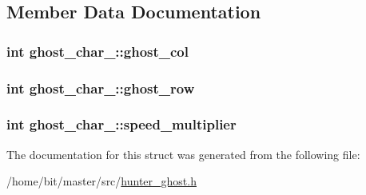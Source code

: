 \subsection{Member Data Documentation}
\hypertarget{structghost__char__2_ac4e881e8acd28d1ba0157a7700a625f2}{
\subsubsection[{ghost\-\_\-col}]{\setlength{\rightskip}{0pt plus 5cm}int ghost\-\_\-char\-\_\-::ghost\-\_\-col}}\label{structghost__char__2_ac4e881e8acd28d1ba0157a7700a625f2}
\hypertarget{structghost__char__2_a20d27159bd360d3caba98c961defec53}{
\subsubsection[{ghost\-\_\-row}]{\setlength{\rightskip}{0pt plus 5cm}int ghost\-\_\-char\-\_\-::ghost\-\_\-row}}\label{structghost__char__2_a20d27159bd360d3caba98c961defec53}
\hypertarget{structghost__char__2_a656d3a3b2495e63e6f4a7f751cc0fea4}{
\subsubsection[{speed\-\_\-multiplier}]{\setlength{\rightskip}{0pt plus 5cm}int ghost\-\_\-char\-\_\-::speed\-\_\-multiplier}}\label{structghost__char__2_a656d3a3b2495e63e6f4a7f751cc0fea4}


The documentation for this struct was generated from the following file\-:\begin{DoxyCompactItemize}
\item 
/home/bit/master/src/\hyperlink{hunter__ghost_8h}{hunter\-\_\-ghost.\-h}\end{DoxyCompactItemize}

